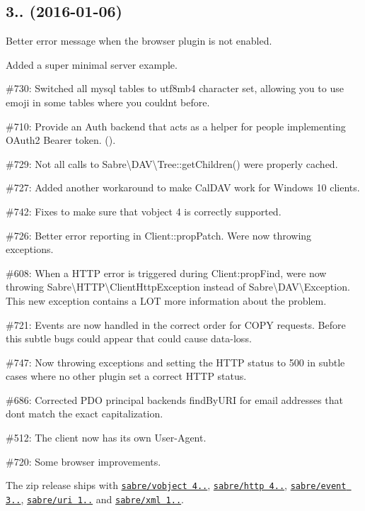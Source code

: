 \subsection*{3.. (2016-\/01-\/06) }


\begin{DoxyItemize}
\item Better error message when the browser plugin is not enabled.
\item Added a super minimal server example.
\item \#730\+: Switched all mysql tables to {\ttfamily utf8mb4} character set, allowing you to use emoji in some tables where you couldn\textquotesingle{}t before.
\item \#710\+: Provide an Auth backend that acts as a helper for people implementing O\+Auth2 Bearer token. ().
\item \#729\+: Not all calls to {\ttfamily Sabre\textbackslash{}D\+AV\textbackslash{}Tree\+::get\+Children()} were properly cached.
\item \#727\+: Added another workaround to make Cal\+D\+AV work for Windows 10 clients.
\item \#742\+: Fixes to make sure that vobject 4 is correctly supported.
\item \#726\+: Better error reporting in {\ttfamily Client\+::prop\+Patch}. We\textquotesingle{}re now throwing exceptions.
\item \#608\+: When a H\+T\+TP error is triggered during {\ttfamily Client\+:prop\+Find}, we\textquotesingle{}re now throwing {\ttfamily Sabre\textbackslash{}H\+T\+TP\textbackslash{}Client\+Http\+Exception} instead of {\ttfamily Sabre\textbackslash{}D\+AV\textbackslash{}Exception}. This new exception contains a L\+OT more information about the problem.
\item \#721\+: Events are now handled in the correct order for {\ttfamily C\+O\+PY} requests. Before this subtle bugs could appear that could cause data-\/loss.
\item \#747\+: Now throwing exceptions and setting the H\+T\+TP status to 500 in subtle cases where no other plugin set a correct H\+T\+TP status.
\item \#686\+: Corrected P\+DO principal backend\textquotesingle{}s find\+By\+U\+RI for email addresses that don\textquotesingle{}t match the exact capitalization.
\item \#512\+: The client now has it\textquotesingle{}s own {\ttfamily User-\/\+Agent}.
\item \#720\+: Some browser improvements.
\item The zip release ships with \href{http://sabre.io/vobject/}{\tt sabre/vobject 4..}, \href{http://sabre.io/http/}{\tt sabre/http 4..}, \href{http://sabre.io/event/}{\tt sabre/event 3..}, \href{http://sabre.io/uri/}{\tt sabre/uri 1..} and \href{http://sabre.io/xml/}{\tt sabre/xml 1..}.
\end{DoxyItemize}

